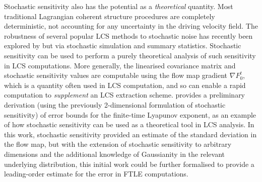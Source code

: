 Stochastic sensitivity also has the potential as a \emph{theoretical} quantity.
Most traditional Lagrangian coherent structure procedures are completely deterministic, not accounting for any uncertainty in the driving velocity field.
The robustness of several popular LCS methods to stochastic noise has recently been explored by \citet{BadzaEtAl_2023_HowSensitiveAre} but via stochastic simulation and summary statistics.
Stochastic sensitivity can be used to perform a purely theoretical analysis of such sensitivity in LCS computations.
More generally, the linearised covariance matrix and stochastic sensitivity values are computable using the flow map gradient \(\nabla F_0^t\), which is a quantity often used in LCS computation, and so can enable a rapid computation to \emph{supplement} an LCS extraction scheme.
\citet{Balasuriya_2020_UncertaintyFinitetimeLyapunov} provides a preliminary derivation (using the previously 2-dimensional formulation of stochastic sensitivity) of error bounds for the finite-time Lyapunov exponent, as an example of how stochastic sensitivity can be used as a theoretical tool in LCS analysis.
In this work, stochastic sensitivity provided an estimate of the standard deviation in the flow map, but with the extension of stochastic sensitivity to arbitrary dimensions and the additional knowledge of Gaussianity in the relevant underlying distribution, this initial work could be further formalised to provide a leading-order estimate for the error in FTLE computations.





